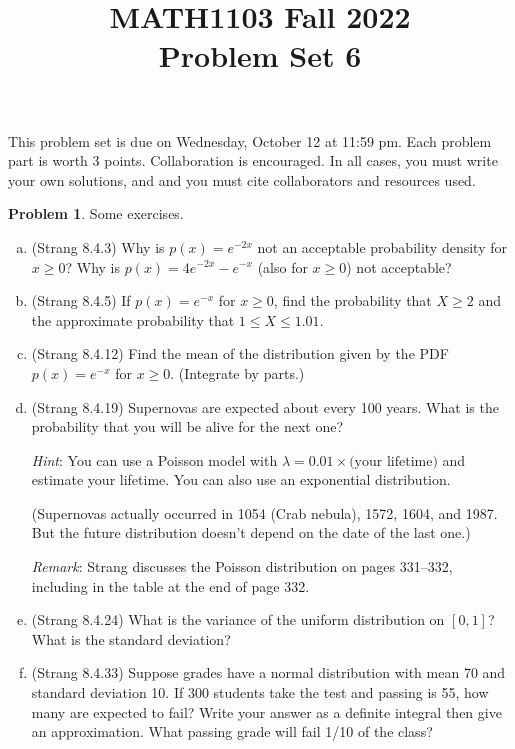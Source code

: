 \documentclass[11pt,oneside]{amsart}
\title{MATH1103 Fall 2022\\
Problem Set 6}
\theoremstyle{definition}
\newtheorem{problem}{Problem}
\begin{document}
    \maketitle
    This problem set is due on Wednesday, October 12 at 11:59 pm. Each problem part is worth 3 points. Collaboration is encouraged. In all cases, you must write your own solutions, and and you must cite collaborators and resources used.

    \begin{problem}
        Some exercises.
        \begin{enumerate}[(a)]
            \item (Strang 8.4.3) Why is $p(x)=e^{-2x}$ not an acceptable probability density for $x\geq 0$? Why is $p(x)=4e^{-2x}-e^{-x}$ (also for $x\geq 0$) not acceptable?
            \item (Strang 8.4.5) If $p(x)=e^{-x}$ for $x\geq 0$, find the probability that $X\geq 2$ and the approximate probability that $1\leq X\leq 1.01$.
            \item (Strang 8.4.12) Find the mean of the distribution given by the PDF $p(x)=e^{-x}$ for $x\geq 0$. (Integrate by parts.)
            \item (Strang 8.4.19) Supernovas are expected about every 100 years. What is the probability that you will be alive for the next one?
            
            \emph{Hint}: You can use a Poisson model with $\lambda=0.01\times\text{(your lifetime)}$ and estimate your lifetime. You can also use an exponential distribution.
            
            (Supernovas actually occurred in 1054 (Crab nebula), 1572, 1604, and 1987. But the future distribution doesn't depend on the date of the last one.)
            
            \emph{Remark}: Strang discusses the Poisson distribution on pages 331--332, including in the table at the end of page 332.
            \item (Strang 8.4.24) What is the variance of the uniform distribution on $[0,1]$? What is the standard deviation?
            \item (Strang 8.4.33) Suppose grades have a normal distribution with mean 70 and standard deviation 10. If 300 students take the test and passing is 55, how many are expected to fail? Write your answer as a definite integral then give an approximation. What passing grade will fail 1/10 of the class?
        \end{enumerate}
    \end{problem}
\end{document}
